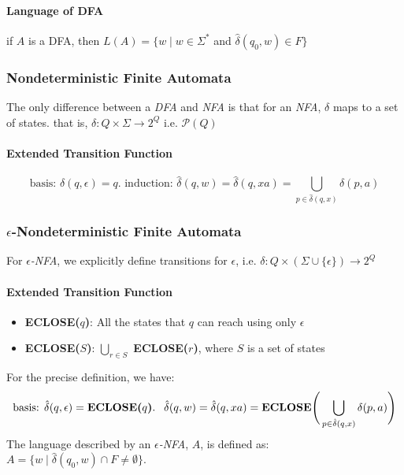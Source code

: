 \documentclass[20pt]{article} %
\begin{document}
\paragraph{Language of DFA} if $A$ is a DFA, then $L(A) = \{ w \mid w \in \Sigma^{*}$ and $\hat{\delta}(q_0, w) \in F \}$
\subsubsection{Nondeterministic Finite Automata}
The only difference between a \textit{DFA} and \textit{NFA} is that for an \textit{NFA}, $\delta$ maps to a set of states. that is, $\delta: Q \times \Sigma \rightarrow 2^{Q}$ i.e. $\mathcal{P}(Q)$
\paragraph{Extended Transition Function}
$$\text{basis: } \hat{\delta}(q, \epsilon) = q. \text{  induction: } \hat{\delta}(q,w) = \hat{\delta}(q, xa) = \bigcup_{p \in \hat{\delta}(q,x)}\delta(p,a)$$
\subsubsection{$\epsilon$-Nondeterministic Finite Automata}
For $\epsilon$\textit{-NFA}, we explicitly define transitions for $\epsilon$, i.e. $\delta: Q \times (\Sigma \cup \{ \epsilon \}) \rightarrow 2^{Q}$
\paragraph{Extended Transition Function}
\begin{itemize}
\item \textbf{ECLOSE($q$)}: All the states that $q$ can reach using only $\epsilon$
\item \textbf{ECLOSE($S$)}: $\bigcup_{r \in S}$ \textbf{ECLOSE($r$)}, where $S$ is a set of states
\end{itemize}
For the precise definition, we have: 
$$\text{basis: } \hat{\delta}(q, \epsilon) = \text{\textbf{ECLOSE($q$)}. } \ \hat{\delta}(q,w) = \hat{\delta}(q, xa) = \text{\textbf{ECLOSE}} \Bigg( \bigcup_{p \in \hat{\delta}(q,x)}\delta(p,a) \Bigg)$$
The language described by an $\epsilon$\textit{-NFA}, $A$, is defined as: $A = \{ w \mid \hat{\delta}(q_0, w) \cap F \neq \emptyset \}$.
\end{document}
